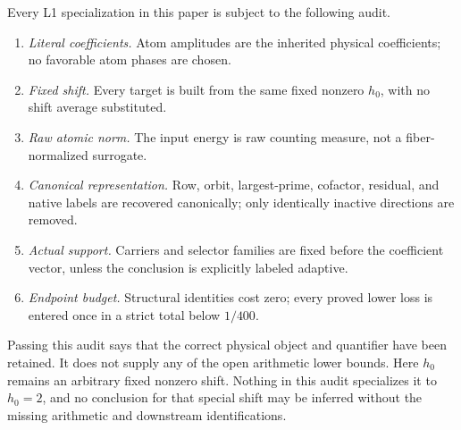 Every L1 specialization in this paper is subject to the following audit.
\begin{enumerate}[label=\textup{(A\arabic*)},leftmargin=3.2em]
 \item \emph{Literal coefficients.}  Atom amplitudes are the inherited
       physical coefficients; no favorable atom phases are chosen.
 \item \emph{Fixed shift.}  Every target is built from the same fixed
       nonzero \(h_0\), with no shift average substituted.
 \item \emph{Raw atomic norm.}  The input energy is raw counting measure,
       not a fiber-normalized surrogate.
 \item \emph{Canonical representation.}  Row, orbit, largest-prime,
       cofactor, residual, and native labels are recovered canonically; only
       identically inactive directions are removed.
 \item \emph{Actual support.}  Carriers and selector families are fixed
       before the coefficient vector, unless the conclusion is explicitly
       labeled adaptive.
 \item \emph{Endpoint budget.}  Structural identities cost zero; every
       proved lower loss is entered once in a strict total below \(1/400\).
\end{enumerate}

Passing this audit says that the correct physical object and quantifier have
been retained.  It does not supply any of the open arithmetic lower bounds.
Here \(h_0\) remains an arbitrary fixed nonzero shift.  Nothing in this
audit specializes it to \(h_0=2\), and no conclusion for that special shift
may be inferred without the missing arithmetic and downstream
identifications.
